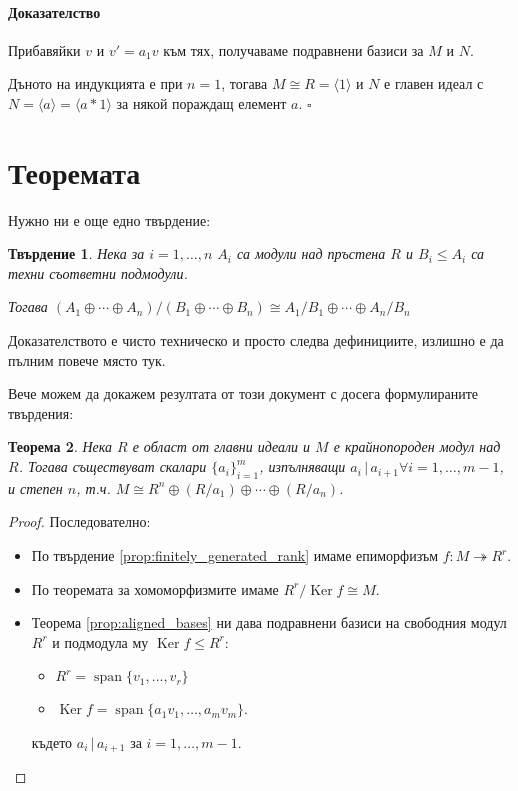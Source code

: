 \documentclass{article}
\newif\ifusemulticols
\theoremstyle{definition}
\theoremstyle{remark}
\theoremstyle{plain}
\newtheorem{theorem}{Теорема}
\theoremstyle{plain}
\newtheorem{prop}[theorem]{Твърдение}
\newenvironment{mymulticols}
    { \ifusemulticols \begin{multicols}{2} \fi }
    { \ifusemulticols \end{multicols} \fi }
\newenvironment{myproof}{\paragraph{Доказателство}}{\hfill$\square$}
\DeclareMathOperator{\vecspan}{span}
\DeclareMathOperator{\Ker}{Ker}
\begin{document}
\begin{mymulticols}
\begin{myproof}
    Прибавяйки $v$ и $v' = a_1 v$ към тях, получаваме подравнени базиси за $M$ и $N$.

    Дъното на индукцията е при $n = 1$, тогава $M \cong R = \langle 1 \rangle$ и $N$ е главен идеал
    с $N = \langle a \rangle = \langle a * 1 \rangle$ за някой пораждащ елемент $a$.
\end{myproof}

\section{Теоремата}%
\label{sec:теоремата}

Нужно ни е още едно твърдение:
\begin{prop}
    Нека за $i = 1, \ldots, n$ $A_i$ са модули над пръстена $R$ и $B_i \le A_i$ са техни съответни
    подмодули.

    Тогава $(A_1 \oplus \cdots \oplus A_n)/(B_1 \oplus \cdots \oplus B_n) \cong A_1/B_1
    \oplus \cdots \oplus A_n/B_n$
\end{prop}

Доказателството е чисто техническо и просто следва дефинициите, излишно е да пълним повече място
тук.

Вече можем да докажем резултата от този документ с досега формулираните твърдения:

\begin{theorem}
    Нека $R$ е област от главни идеали и $M$ е крайнопороден модул над $R$. Тогава съществуват
    скалари $\{ a_i \}_{i=1}^m$, изпълняващи $a_i \,|\, a_{i+1} \forall i = 1,\ldots,m-1$, и степен
    $n$, т.ч. $M \cong R^n \oplus (R/a_1) \oplus \cdots \oplus (R/a_n)$.
\end{theorem}
\begin{proof}
    Последователно:
    \begin{itemize}
        \item По твърдение \ref{prop:finitely_generated_rank} имаме епиморфизъм $f : M \twoheadrightarrow R^r$.
        \item По теоремата за хомоморфизмите имаме $R^r / \Ker f \cong M$.
        \item Теорема \ref{prop:aligned_bases} ни дава подравнени базиси на свободния модул
            $R^r$ и подмодула му $\Ker f \le R^r$:
            \begin{itemize}
                \item $R^r = \vecspan \{ v_1, \ldots, v_r\}$
                \item $\Ker f = \vecspan \{ a_1 v_1, \ldots, a_m v_m\}$.
            \end{itemize}
            където $a_i \,| \,a_{i+1}$ за $i=1,\ldots,m-1$.


\end{itemize}
\end{proof}
\end{mymulticols}
\end{document}
